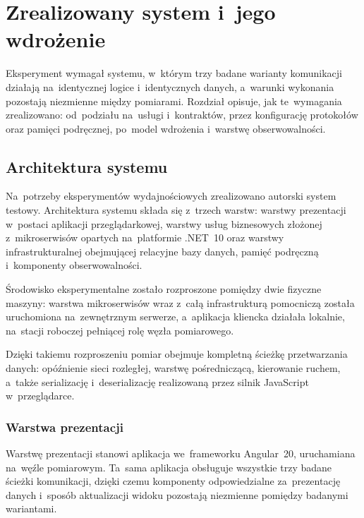 \cleardoublepage

\chapter{Zrealizowany system i~jego wdrożenie}

\label{cha:StudiumPrzypadku}

Eksperyment wymagał systemu, w~którym trzy badane warianty komunikacji działają na~identycznej logice i~identycznych danych, a~warunki wykonania pozostają niezmienne między pomiarami. Rozdział opisuje, jak te~wymagania zrealizowano: od~podziału na~usługi i~kontraktów, przez konfigurację protokołów oraz pamięci podręcznej, po~model wdrożenia i~warstwę obserwowalności.

\section{Architektura systemu}
\label{sec:ArchitekturaSystemu}

Na~potrzeby eksperymentów wydajnościowych zrealizowano autorski system testowy. Architektura systemu składa się z~trzech warstw: warstwy prezentacji w~postaci aplikacji przeglądarkowej, warstwy usług biznesowych złożonej z~mikroserwisów opartych na~platformie .NET~10 oraz warstwy infrastrukturalnej obejmującej relacyjne bazy danych, pamięć podręczną i~komponenty obserwowalności.

Środowisko eksperymentalne zostało rozproszone pomiędzy dwie fizyczne maszyny: warstwa mikroserwisów wraz z~całą infrastrukturą pomocniczą została uruchomiona na~zewnętrznym serwerze, a~aplikacja kliencka działała lokalnie, na~stacji roboczej pełniącej rolę węzła pomiarowego.

Dzięki takiemu rozproszeniu pomiar obejmuje kompletną ścieżkę przetwarzania danych: opóźnienie sieci rozległej, warstwę pośredniczącą, kierowanie ruchem, a~także serializację i~deserializację realizowaną przez silnik JavaScript w~przeglądarce.

\subsection{Warstwa prezentacji}
\label{subsec:WarstwaPrezentacji}

Warstwę prezentacji stanowi aplikacja we~frameworku Angular~20, uruchamiana na~węźle pomiarowym. Ta~sama aplikacja obsługuje wszystkie trzy badane ścieżki komunikacji, dzięki czemu komponenty odpowiedzialne za~prezentację danych i~sposób aktualizacji widoku pozostają niezmienne pomiędzy badanymi wariantami.

